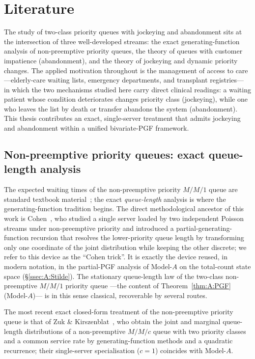 \section{Literature}\label{sec:literature}

The study of two-class priority queues with jockeying and abandonment sits at the intersection of three well-developed streams: the exact generating-function analysis of non-preemptive priority queues, the theory of queues with customer impatience (abandonment), and the theory of jockeying and dynamic priority changes. The applied motivation throughout is the management of access to care ---elderly-care waiting lists, emergency departments, and transplant registries--- in which the two mechanisms studied here carry direct clinical readings: a waiting patient whose condition deteriorates changes priority class (jockeying), while one who leaves the list by death or transfer abandons the system (abandonment). This thesis contributes an exact, single-server treatment that admits jockeying and abandonment within a unified bivariate-PGF framework.

\subsection*{Non-preemptive priority queues: exact queue-length analysis}

The expected waiting times of the non-preemptive priority $M/M/1$ queue are standard textbook material~\cite{adan2002queueing}; the exact \emph{queue-length} analysis is where the generating-function tradition begins. The direct methodological ancestor of this work is Cohen~\cite{cohen1956delay}, who studied a single server loaded by two independent Poisson streams under non-preemptive priority and introduced a partial-generating-function recursion that resolves the lower-priority queue length by transforming only one coordinate of the joint distribution while keeping the other discrete; we refer to this device as the ``Cohen trick''. It is exactly the device reused, in modern notation, in the partial-PGF analysis of Model-$A$ on the total-count state space (\S\ref{ssec:A:Stilde}). The stationary queue-length law of the two-class non-preemptive $M/M/1$ priority queue ---the content of Theorem~\ref{thm:A:PGF} (Model-$A$)--- is in this sense classical, recoverable by several routes.

The most recent exact closed-form treatment of the non-preemptive priority queue is that of Zuk \& Kirszenblat~\cite{zuk2023explicit}, who obtain the joint and marginal queue-length distributions of a non-preemptive $M/M/c$ queue with two priority classes and a common service rate by generating-function methods and a quadratic recurrence; their single-server specialisation ($c=1$) coincides with Model-$A$.

